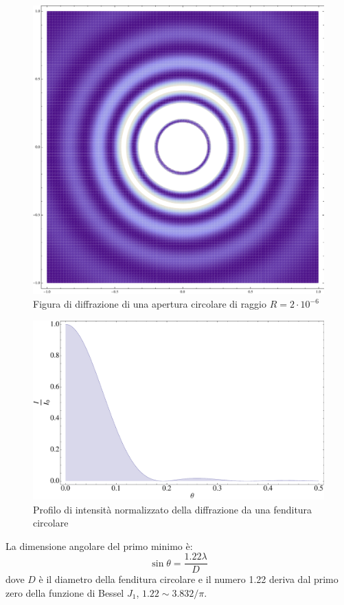 \documentclass[a4paper,10pt,oneside]{article}
\begin{document}
\begin{figure}[H]
 \centering
 \includegraphics[width=\textwidth]{./Immagini/diffrazione4.pdf}
 \caption{Figura di diffrazione di una apertura circolare di raggio $R=2\cdot 10^{-6}$}
 \label{fig:diffrazione_circolare}
\end{figure}


\begin{figure}
 \centering
 \includegraphics[width=\textwidth]{./Immagini/diffrazione5.pdf}
 \caption{Profilo di intensità normalizzato della diffrazione da una fenditura circolare}
 \label{fig:bessel_2}
\end{figure}

La dimensione angolare del primo minimo è:
\begin{equation}
 \sin\theta=\frac{1.22\lambda}{D}
\end{equation}
dove $D$ è il diametro della fenditura circolare e il numero 1.22 deriva dal primo zero della funzione di Bessel $J_1$, $1.22\sim 3.832/\pi$.
\end{document}
